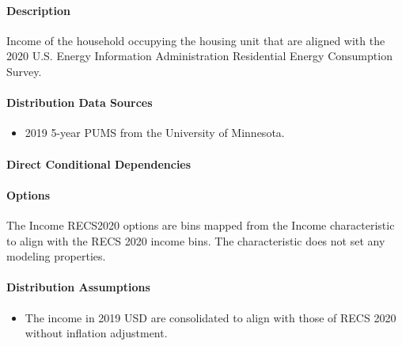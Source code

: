 \paragraph{Description}
% 
Income of the household occupying the housing unit that are aligned
with the 2020 U.S. Energy Information Administration Residential Energy
Consumption Survey.

\paragraph{Distribution Data Sources}
% 
\begin{itemize} 
\item
  2019 5-year PUMS from the University of Minnesota.
\end{itemize}

\paragraph{Direct Conditional Dependencies}


\paragraph{Options}
The Income RECS2020 options are bins mapped from the Income characteristic to align with the RECS 2020 income bins. The characteristic does not set any modeling properties.

\paragraph{Distribution Assumptions}
% 
\begin{itemize}
\item
  The income in 2019 USD are consolidated to align with those of RECS 2020 without inflation adjustment.
\end{itemize}
